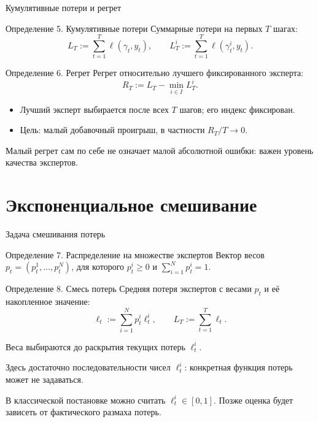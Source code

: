 \documentclass[11pt,aspectratio=169]{beamer}
\begin{document}
\begin{frame}{Кумулятивные потери и регрет}
  \begin{block}{Определение 5. Кумулятивные потери}
    Суммарные потери на первых $T$ шагах:
    \[
      L_T:=\sum_{t=1}^T\ell(\gamma_t,y_t),\qquad
      L_T^i:=\sum_{t=1}^T\ell(\gamma_t^i,y_t).
    \]
  \end{block}
  \begin{block}{Определение 6. Регрет}
    Регрет относительно лучшего фиксированного эксперта:
    \[R_T:=L_T-\min_{i\in I}L_T^i.\]
  \end{block}
  \begin{itemize}
    \item Лучший эксперт выбирается после всех $T$ шагов; его индекс фиксирован.
    \item Цель: малый добавочный проигрыш, в частности $R_T/T\to0$.
  \end{itemize}
  \par\vfill{\scriptsize Малый регрет сам по себе не означает малой абсолютной ошибки: важен уровень качества экспертов.\par}
\end{frame}

\section{Экспоненциальное смешивание}
\begin{frame}{Задача смешивания потерь}
  \begin{block}{Определение 7. Распределение на множестве экспертов}
    Вектор весов $p_t=(p_t^1,\ldots,p_t^N)$, для которого
    $p_t^i\ge0$ и $\sum_{i=1}^N p_t^i=1$.
  \end{block}
  \begin{block}{Определение 8. Смесь потерь}
    Средняя потеря экспертов с весами $p_t$ и её накопленное значение:
    \[
      \ell_t:=\sum_{i=1}^N p_t^i\ell_t^i,\qquad
      L_T:=\sum_{t=1}^T\ell_t.
    \]
  \end{block}
  Веса выбираются до раскрытия текущих потерь $\ell_t^i$.
  \par\smallskip
  Здесь достаточно последовательности чисел $\ell_t^i$:
  конкретная функция потерь может не задаваться.
  \par\vfill{\scriptsize В классической постановке можно считать $\ell_t^i\in[0,1]$. Позже оценка будет зависеть от фактического размаха потерь.\par}
\end{frame}
\end{document}
